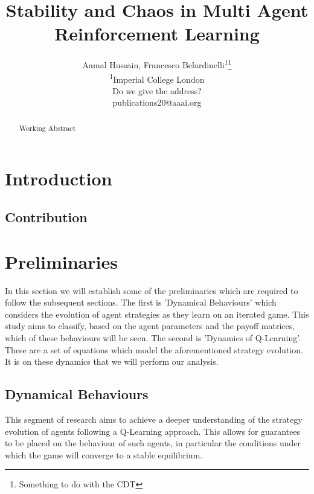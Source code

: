 \documentclass[letterpaper]{article} %
\title{Stability and Chaos in Multi Agent Reinforcement Learning}
\author{Aamal Hussain, Francesco Belardinelli\textsuperscript{\rm 1}\thanks{Something to do with the
CDT}\\ %
\textsuperscript{\rm 1}Imperial College London\\ %
Do we give the address?\\
publications20@aaai.org %
}
\begin{document}
\maketitle

\begin{abstract}
Working Abstract
\end{abstract}

\section{Introduction}

\subsection{Contribution}

\section{Preliminaries}

In this section we will establish some of the preliminaries which are required to follow the subsequent sections. The first is 'Dynamical Behaviours' which considers the evolution of agent strategies as they learn on an iterated game. This study aims to classify, based on the agent parameters and the payoff matrices, which of these behaviours will be seen. The second is 'Dynamics of Q-Learning'. These are a set of equations which model the aforementioned strategy evolution. It is on these dynamics that we will perform our analysis.

\subsection{Dynamical Behaviours}

 This segment of research aims to achieve a deeper understanding
    of the strategy evolution of agents following a Q-Learning
    approach. This allows for guarantees to be placed on the behaviour
    of such agents, in particular the conditions under which the game
    will converge to a stable equilibrium.
\end{document}

